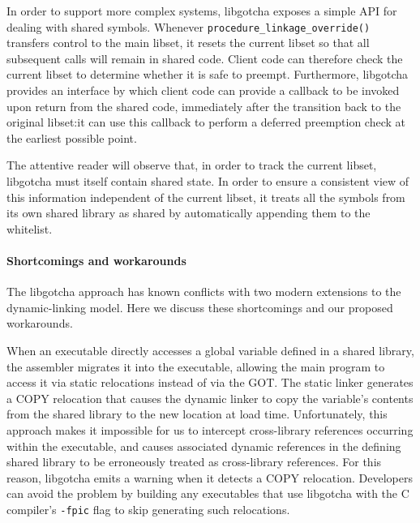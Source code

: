 In order to support more complex systems, libgotcha exposes a simple API for dealing
with shared symbols.  Whenever \texttt{procedure\_linkage\_override()} transfers
control to the main libset, it resets the current libset so that all subsequent calls
will remain in shared code.  Client code can therefore check the current libset to
determine
whether it is safe to preempt.  Furthermore, libgotcha provides an interface by which
client code can provide a callback to be invoked upon return from the shared code,
immediately after the transition back to the original libset:\@ it can use this
callback to perform a deferred preemption check at the earliest possible point.

The attentive reader will observe that, in order to track the current libset,
libgotcha must itself contain shared state.  In order to ensure a consistent view of
this information independent of the current libset, it treats all the symbols from
its own shared library as shared by automatically appending them to the whitelist.

\paragraph{Shortcomings and workarounds}

The libgotcha approach has known conflicts with two modern extensions to the
dynamic-linking model.  Here we discuss these shortcomings and our proposed
workarounds.

When an executable directly accesses a global variable defined in a shared library,
the assembler migrates it into the executable, allowing the main program to access it
via static relocations instead of via the GOT.  The static linker generates a COPY
relocation that causes the dynamic linker to copy the variable's contents from the
shared library to the new location at load time.  Unfortunately, this approach makes
it impossible for us to intercept cross-library references occurring within the
executable, and causes associated dynamic references in the defining shared library
to be erroneously treated as cross-library references.  For this reason, libgotcha
emits a warning when it detects a COPY relocation.  Developers can avoid the problem
by building any executables that use libgotcha with the C compiler's \texttt{-fpic}
flag to skip generating such relocations.

